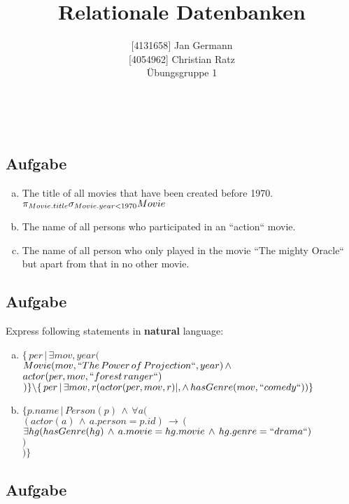 \documentclass[11pt,a4paper,DIV=9]{scrartcl}
\author{{[}4131658{]} Jan Germann \\{[}4054962{]} Christian Ratz\\Übungsgruppe 1}
\title{Relationale Datenbanken}
\newcounter{temp}
\newcommand{\aufgabe}[1]{
  \setcounter{temp}{\value{subsection}}
  \setcounter{subsection}{#1}
  \addtocounter{subsection}{-1}
  \subsection{Aufgabe}
  \setcounter{subsection}{\value{temp}}
}
\renewcommand{\author}[1]{\renewcommand{\author}{#1}}
\renewcommand{\title}[1]{\renewcommand{\title}{#1}}
\newcommand{\makehomeworktitle}{
  \begin{minipage}[t]{6.5cm}
    \sf{\author}
  \end{minipage}
  \begin{minipage}[t]{6.5cm}
    \begin{flushright}
      \sf{\title\\\today}
    \end{flushright}
  \end{minipage}
  \\[0.2cm]
  \begin{center}
    \sf{
      \color{blue}{
        \LARGE{Aufgabenblatt \blattnr}
      }
    }
  \end{center}
  \vspace{0.1cm}
}
\begin{document}
\makehomeworktitle
\aufgabe{1}
  \begin{enumerate}[a)]
    \item The title of all movies that have been created before 1970.\hfill\\
      $
      \pi_{Movie.title}\\
      \sigma_{Movie.year < 1970}\\
      Movie
      $
    \item The name of all persons who participated in an ``action`` movie. \hfill\\
      
    \item The name of all person who only played in the movie ``The mighty Oracle`` but apart from that in no other movie.\hfill\\
      
      \end{enumerate}
\aufgabe{2}
Express following statements in \textbf{natural} language:
 \begin{enumerate}[a)]
   \item 
   $ 
   \{\, per \, | \, \exists mov, year ( 
   $ 
   \\ 
   $
   Movie(mov, ``The \, Power \, of \, Projection``, year) \,  \wedge \, 
   $ 
   \\ 
   $
   actor(per,mov, ``forest \, ranger``) 
   $ 
   \\ 
   $
   ) \} \backslash \{ \,per \, | \, \exists mov, r(actor(per, mov, r) |, \wedge \, hasGenre(mov, ``comedy``))\}
   $
   \item 
   $
   \{p.name \, | \, Person(p) \, \wedge \, \forall a( 
   $
   \\ 
   $ 
   (actor(a) \, \wedge \, a.person=p.id) \, \rightarrow \, ( 
   $
   \\
   $
   \exists hg(hasGenre(hg) \, \wedge \, a.movie=hg.movie \, \wedge \, hg.genre=``drama``)
   $
   \\
   $ 
   )
   $
   \\
   $
   ) \}
   $
 \end{enumerate}
\aufgabe{3}
\end{document}
